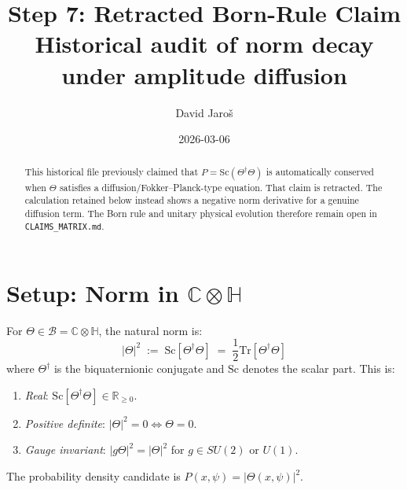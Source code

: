 \documentclass[12pt,a4paper]{article}
\title{\textbf{Step 7: Retracted Born-Rule Claim}\\
         \large Historical audit of norm decay under amplitude diffusion}
\author{David Jaro\v{s}}
\date{2026-03-06}
\theoremstyle{definition}
\theoremstyle{remark}
\begin{document}
  \maketitle

  \begin{abstract}
  This historical file previously claimed that
  $P=\mathrm{Sc}(\Theta^\dagger\Theta)$ is automatically conserved when
  $\Theta$ satisfies a diffusion/Fokker--Planck-type equation.  That claim is
  retracted.  The calculation retained below instead shows a negative norm
  derivative for a genuine diffusion term.  The Born rule and unitary physical
  evolution therefore remain open in \texttt{CLAIMS\_MATRIX.md}.
  \end{abstract}
\fi

\begin{center}
\end{center}

\section{Setup: Norm in $\mathbb{C}\otimes\mathbb{H}$}
\label{sec:setup}

For $\Theta \in \mathcal{B} = \mathbb{C}\otimes\mathbb{H}$, the natural
norm is:
\begin{equation}
  |\Theta|^2 \;:=\; \mathrm{Sc}[\Theta^\dagger\Theta]
             \;=\; \frac{1}{2}\mathrm{Tr}[\Theta^\dagger\Theta]
  \label{eq:norm}
\end{equation}
where $\Theta^\dagger$ is the biquaternionic conjugate and $\mathrm{Sc}$
denotes the scalar part.  This is:
\begin{enumerate}
  \item \emph{Real}: $\mathrm{Sc}[\Theta^\dagger\Theta] \in \mathbb{R}_{\geq 0}$.
  \item \emph{Positive definite}: $|\Theta|^2 = 0 \Leftrightarrow \Theta = 0$.
  \item \emph{Gauge invariant}: $|g\Theta|^2 = |\Theta|^2$ for $g \in SU(2)$ or $U(1)$.
\end{enumerate}
The probability density candidate is $P(x,\psi) = |\Theta(x,\psi)|^2$.
\end{document}
